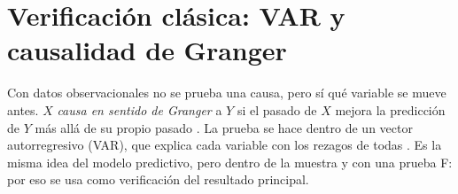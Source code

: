\section{Verificación clásica: VAR y causalidad de Granger}

Con datos observacionales no se prueba una causa, pero sí qué variable se mueve antes. $X$
\textit{causa en sentido de Granger} a $Y$ si el pasado de $X$ mejora la predicción de $Y$ más allá
de su propio pasado \citep{granger1969}. La prueba se hace dentro de un vector autorregresivo
(VAR), que explica cada variable con los rezagos de todas \citep{sims1980,lutkepohl2005}. Es la
misma idea del modelo predictivo, pero dentro de la muestra y con una prueba F: por eso se usa
como verificación del resultado principal.
